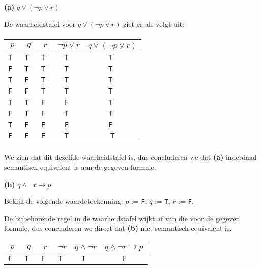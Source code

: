 \documentclass[a4paper,11pt]{article}
\begin{document}
\begin{description}

\item{\bf (a)} $q \vee (\neg p \vee r)$

De waarheidstafel voor $q \vee (\neg p \vee r)$ ziet er als volgt uit:

\paragraph{}

\begin{tabular}{c|c|c|c|c}
$p$   & $q$   & $r$   & $\neg p \vee r$ & $q \vee (\neg p \vee r)$ \\
\hline
\tt T & \tt T & \tt T & \tt T           & \tt T \\
\tt F & \tt T & \tt T & \tt T           & \tt T \\
\tt T & \tt F & \tt T & \tt T           & \tt T \\
\tt F & \tt F & \tt T & \tt T           & \tt T \\
\tt T & \tt T & \tt F & \tt F           & \tt T \\
\tt F & \tt T & \tt F & \tt T           & \tt T \\
\tt T & \tt F & \tt F & \tt F           & \tt F \\
\tt F & \tt F & \tt F & \tt T           & \tt T
\end{tabular}

\paragraph{}

We zien dat dit dezelfde waarheidstafel is, dus concluderen we dat \textbf{(a)}
inderdaad semantisch equivalent is aan de gegeven formule.

\item{\bf (b)} $q \wedge \neg r \rightarrow p$

Bekijk de volgende waardetoekenning: $p$ := \texttt{F}, $q$ := \texttt{T}, $r$ := \texttt{F}.

De bijbehorende regel in de waarheidstafel wijkt af van die voor de gegeven formule, dus
concluderen we direct dat \textbf{(b)} niet semantisch equivalent is.

\begin{tabular}{c|c|c|c|c|c}
$p$   & $q$   & $r$   & $\neg r$ & $q \wedge \neg r$ & $q \wedge \neg r \rightarrow p$ \\
\hline
\tt F & \tt T & \tt F & \tt T    & \tt T             & \tt F
\end{tabular}


\end{description}
\end{document}
